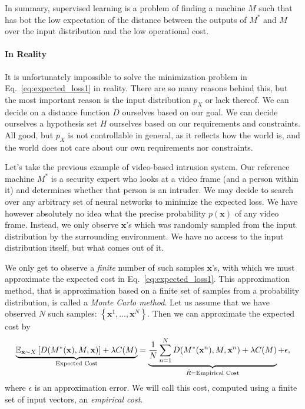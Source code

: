 \documentclass{report}
\newcommand{\vect}[1]{\mathbf{#1}}
\newcommand{\vx}[0]{\vect{x}}
\begin{document}
In summary, supervised learning is a problem of finding a machine $M$ such that
has bot the low expectation of the distance between the outputs of $M^*$ and
$M$ over the input distribution and the low operational cost.

\paragraph{In Reality}

It is unfortunately impossible to solve the minimization problem in
Eq.~\eqref{eq:expected_loss1} in reality. There are so many reasons behind this,
but the most important reason is the input distribution $p_X$ or lack thereof.
We can decide on a distance function $D$ ourselves based on our goal. We can
decide ourselves a hypothesis set $H$ ourselves based on our requirements and
constraints. All good, but $p_X$ is not controllable in general, as it reflects
how the world is, and the world does not care about our own requirements nor
constraints.  

Let's take the previous example of video-based intrusion system. Our reference
machine $M^*$ is a security expert who looks at a video frame (and a person
within it) and determines whether that person is an intruder. We may decide to
search over any arbitrary set of neural networks to minimize the expected loss.
We have however absolutely no idea what the precise probability $p(\vx)$ of any
video frame. Instead, we only observe $\vx$'s which was randomly sampled from
the input distribution by the surrounding environment. We have no access to the
input distribution itself, but what comes out of it. 

We only get to observe a {\it finite} number of such samples $\vx$'s, with which
we must approximate the expected cost in Eq.~\eqref{eq:expected_loss1}. This
approximation method, that is approximation based on a finite set of samples
from a probability distribution, is called a {\it Monte Carlo method}.  Let us
assume that we have observed $N$ such samples: $\left\{ \vx^1, \ldots, \vx^N
\right\}$. Then we can approximate the expected cost by
\begin{align}
    \label{eq:empirical_loss}
    \underbrace{\mathbb{E}_{\vx \sim X} \left[ D(M^*(\vx), M, \vx) \right] +
    \lambda C(M)}_{
        \mathclap{\text{Expected Cost}}
    } =
    \underbrace{
        \frac{1}{N} \sum_{n=1}^N D(M^*(\vx^n), M, \vx^n)
        + \lambda C(M)
    }_{\mathclap{\tilde{R} = \text{Empirical Cost}}} + \epsilon,
\end{align}
where $\epsilon$ is an approximation error. We will call this cost, computed
using a finite set of input vectors, an {\it empirical cost}. 
\end{document}
